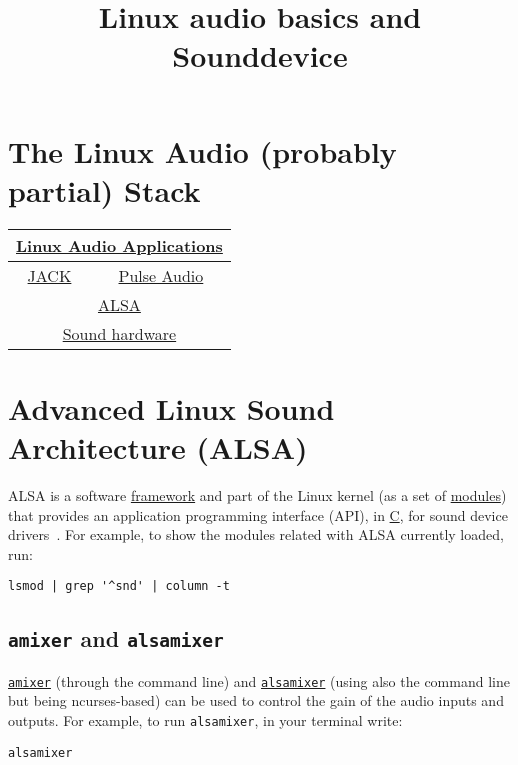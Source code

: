 
\title{Linux audio basics and Sounddevice}

\maketitle

\section{The Linux Audio (probably partial) Stack}

\begin{center}
\begin{tabular}{|c|c|}
\hline
\multicolumn{2}{c}{\href{https://en.wikipedia.org/wiki/List\_of\_Linux\_audio\_software}{Linux Audio Applications}} \\
\hline
\href{https://jackaudio.org/}{JACK} & \href{https://www.freedesktop.org/wiki/Software/PulseAudio/}{Pulse Audio} \\
\hline
\multicolumn{2}{c}{\href{https://www.alsa-project.org}{ALSA}} \\
\hline
\multicolumn{2}{c}{\href{https://www.alsa-project.org/wiki/Matrix:Main}{Sound hardware}} \\
\hline
\end{tabular}
\end{center}

\section{Advanced Linux Sound Architecture (ALSA)}
ALSA is a software
\href{https://docs.kernel.org/sound/kernel-api/index.html}{framework}
and part of the Linux kernel (as a set of
\href{https://wiki.archlinux.org/title/Kernel_module}{modules}) that
provides an application programming interface (API), in
\href{https://en.wikipedia.org/wiki/C_(programming_language)}{C}, for
sound device drivers~\cite{phillips2005user}. For example, to show the
modules related with ALSA currently loaded, run:
\begin{verbatim}
lsmod | grep '^snd' | column -t
\end{verbatim}

\subsection{\texttt{amixer} and \texttt{alsamixer}}
\texttt{\href{https://linux.die.net/man/1/amixer}{amixer}} (through the command line) and \texttt{\href{https://en.wikipedia.org/wiki/Alsamixer}{alsamixer}} (using also the command line but being ncurses-based) can be used to control the gain of the audio inputs and outputs. For example, to run \texttt{alsamixer}, in your terminal write:
\begin{verbatim}
alsamixer
\end{verbatim}

